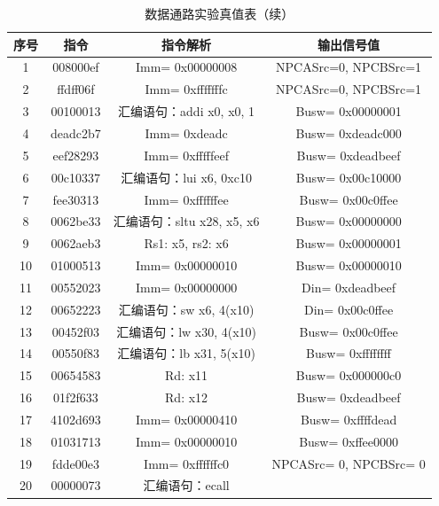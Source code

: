 \documentclass[12pt, a4paper]{ctexart}
\begin{document}
\begin{table}[H]
    \centering
    \begin{tabular}{|c|c|c|c|}
        \hline
        序号 & 指令 & 指令解析 & 输出信号值 \\ \hline
        1 & 008000ef & Imm= 0x00000008 & NPCASrc=0, NPCBSrc=1 \\ \hline
        2 & ffdff06f & Imm= 0xfffffffc & NPCASrc=0, NPCBSrc=1 \\ \hline
        3 & 00100013 & 汇编语句：addi x0, x0, 1 & Busw= 0x00000001 \\ \hline
        4 & deadc2b7 & Imm= 0xdeadc & Busw= 0xdeadc000 \\ \hline
        5 & eef28293 & Imm= 0xfffffeef & Busw= 0xdeadbeef \\ \hline
        6 & 00c10337 & 汇编语句：lui x6, 0xc10 & Busw= 0x00c10000 \\ \hline
        7 & fee30313 & Imm= 0xffffffee & Busw= 0x00c0ffee \\ \hline
        8 & 0062be33 & 汇编语句：sltu x28, x5, x6 & Busw= 0x00000000 \\ \hline
        9 & 0062aeb3 & Rs1: x5, rs2: x6 & Busw= 0x00000001 \\ \hline
        10 & 01000513 & Imm= 0x00000010 & Busw= 0x00000010 \\ \hline
        11 & 00552023 & Imm= 0x00000000 & Din= 0xdeadbeef \\ \hline
        12 & 00652223 & 汇编语句：sw x6, 4(x10) & Din= 0x00c0ffee \\ \hline
        13 & 00452f03 & 汇编语句：lw x30, 4(x10) & Busw= 0x00c0ffee \\ \hline
        14 & 00550f83 & 汇编语句：lb x31, 5(x10) & Busw= 0xffffffff \\ \hline
        15 & 00654583 & Rd: x11 & Busw= 0x000000c0 \\ \hline
        16 & 01f2f633 & Rd: x12 & Busw= 0xdeadbeef \\ \hline
        17 & 4102d693 & Imm= 0x00000410 & Busw= 0xffffdead \\ \hline
        18 & 01031713 & Imm= 0x00000010 & Busw= 0xffee0000 \\ \hline
        19 & fdde00e3 & Imm= 0xffffffc0 & NPCASrc= 0, NPCBSrc= 0 \\ \hline
        20 & 00000073 & 汇编语句：ecall &  \\ \hline
    \end{tabular}
    \caption{数据通路实验真值表（续）}
\end{table}
\end{document}
